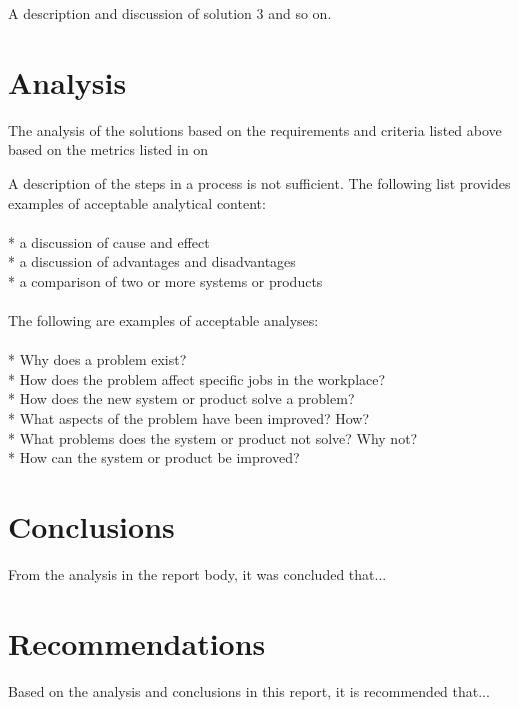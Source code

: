 \documentclass{wkrpt}
\begin{document}
A description and discussion of solution 3 and so on.

\section{Analysis}

The analysis of the solutions based on the requirements and criteria listed above based on the metrics listed in  on 

A description of the steps in a process is not sufficient. The following list provides examples of acceptable analytical content:\\
\\
* a discussion of cause and effect\\
* a discussion of advantages and disadvantages\\
* a comparison of two or more systems or products\\
\\
The following are examples of acceptable analyses:\\
\\
* Why does a problem exist?\\
* How does the problem affect specific jobs in the workplace?\\
* How does the new system or product solve a problem?\\
* What aspects of the problem have been improved? How?\\
* What problems does the system or product not solve? Why not?\\
* How can the system or product be improved?\\


\section*{Conclusions}

From the analysis in the report body, it was concluded that...

\section*{Recommendations}

Based on the analysis and conclusions in this report, it is recommended that...

\end{document}
